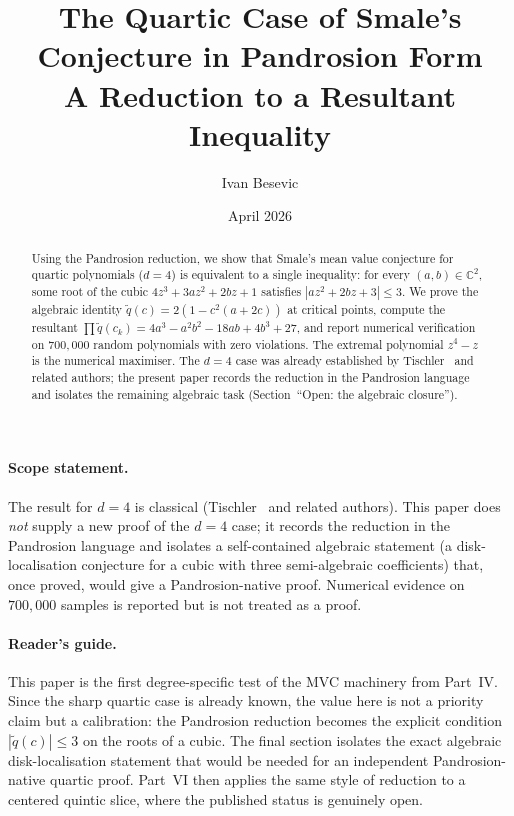 \documentclass[11pt,a4paper]{article}
\title{The Quartic Case of Smale's Conjecture in Pandrosion Form \\ A Reduction to a Resultant Inequality}
\author{Ivan Besevic}
\date{April 2026}
\begin{document}
\maketitle

\begin{abstract}
Using the Pandrosion reduction, we show that Smale's mean value conjecture for quartic polynomials ($d = 4$) is equivalent to a single inequality: for every $(a, b) \in \mathbb{C}^2$, some root of the cubic $4z^3 + 3az^2 + 2bz + 1$ satisfies $|az^2 + 2bz + 3| \le 3$. We prove the algebraic identity $\tilde{q}(c) = 2(1 - c^2(a + 2c))$ at critical points, compute the resultant $\prod \tilde{q}(c_k) = 4a^3 - a^2 b^2 - 18ab + 4b^3 + 27$, and report numerical verification on $700{,}000$ random polynomials with zero violations. The extremal polynomial $z^4 - z$ is the numerical maximiser. The $d = 4$ case was already established by Tischler~\cite{tischler} and related authors; the present paper records the reduction in the Pandrosion language and isolates the remaining algebraic task (Section~``Open: the algebraic closure'').
\end{abstract}

\paragraph{Scope statement.} The result for $d = 4$ is classical (Tischler~\cite{tischler} and related authors). This paper does \emph{not} supply a new proof of the $d = 4$ case; it records the reduction in the Pandrosion language and isolates a self-contained algebraic statement (a disk-localisation conjecture for a cubic with three semi-algebraic coefficients) that, once proved, would give a Pandrosion-native proof. Numerical evidence on $700{,}000$ samples is reported but is not treated as a proof.

\paragraph{Reader's guide.}
This paper is the first degree-specific test of the MVC machinery from
Part~IV. Since the sharp quartic case is already known, the value here is not a
priority claim but a calibration: the Pandrosion reduction becomes the explicit
condition $|\tilde q(c)|\le3$ on the roots of a cubic. The final section isolates
the exact algebraic disk-localisation statement that would be needed for an
independent Pandrosion-native quartic proof. Part~VI then applies the same
style of reduction to a centered quintic slice, where the published status is
genuinely open.
\end{document}
